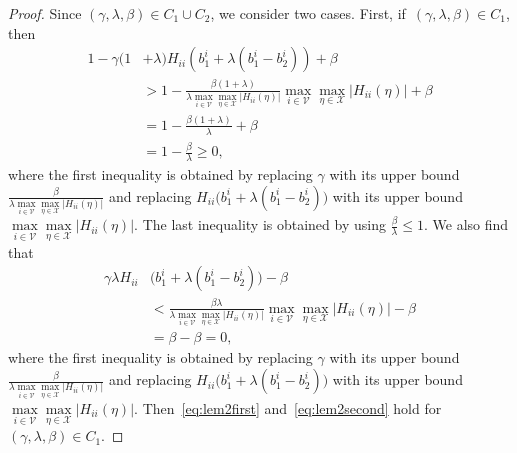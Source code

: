 \documentclass[9pt,shortpaper,twoside,web]{ieeecolor}
\newcommand{\X}{\ensuremath{\mathcal{X}}\xspace}
\newcommand{\V}{\ensuremath{\mathcal{V}}\xspace}
\begin{document}
\begin{proof}
    Since $(\gamma, \lambda, \beta) \in C_1\cup C_2$, we consider two cases.
    First, if~$(\gamma,\lambda,\beta)\in C_1$, then
    \begin{align}
        1 - \gamma(1 &+ \lambda)H_{ii}(b^i_1 +\lambda(b^i_1-b^i_2)) + \beta 
    \\&> 1-\frac{\beta(1+\lambda)}{\lambda \max\limits_{i\in\V}\max\limits_{\eta\in\X}\vert H_{ii}(\eta)\vert}\max\limits_{i\in\V}\max\limits_{\eta\in\X}\vert H_{ii}(\eta)\vert +\beta
    \\&= 1-\frac{\beta(1+\lambda)}{\lambda}+\beta
    \\&= 1-\frac{\beta}{\lambda}\geq 0,
    \end{align}
    where the first inequality is obtained by replacing $\gamma$ with its upper bound $\frac{\beta}{\lambda \max\limits_{i\in\V}\max\limits_{\eta\in\X}\vert H_{ii}(\eta)\vert}$ and replacing $H_{ii}\big(b^i_1+\lambda(b^i_1-b^i_2)\big)$ with its upper bound $\max\limits_{i\in\V}\max\limits_{\eta\in\X}\vert H_{ii}(\eta)\vert$. The last inequality is obtained by using $\frac{\beta}{\lambda}\leq1$. We also find that 
    \begin{align}
        \gamma\lambda H_{ii}&\big(b^i_1+\lambda(b^i_1-b^i_2)\big)-\beta
    \\&< \frac{\beta\lambda}{\lambda \max\limits_{i\in\V}\max\limits_{\eta\in\X}\vert H_{ii}(\eta)\vert}\max\limits_{i\in\V}\max\limits_{\eta\in\X}\vert H_{ii}(\eta)\vert -\beta
    \\&= \beta - \beta = 0, 
    \end{align}
    where the first inequality is obtained by replacing $\gamma$ with its upper bound $\frac{\beta}{\lambda \max\limits_{i\in\V}\max\limits_{\eta\in\X}\vert H_{ii}(\eta)\vert}$ and replacing $H_{ii}\big(b^i_1+\lambda(b^i_1-b^i_2)\big)$ with its upper bound $\max\limits_{i\in\V}\max\limits_{\eta\in\X}\vert H_{ii}(\eta)\vert$.
    Then~\eqref{eq:lem2first} and~\eqref{eq:lem2second} hold for~$(\gamma,\lambda,\beta)\in C_1$. 
    

\end{proof}
\end{document}

